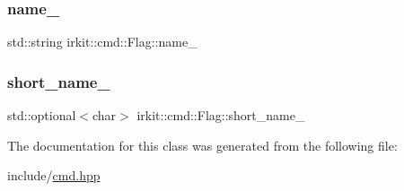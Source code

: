 \subsubsection{\texorpdfstring{name\+\_\+}{name\_}}
{\footnotesize\ttfamily std\+::string irkit\+::cmd\+::\+Flag\+::name\+\_\+\hspace{0.3cm}{\ttfamily [protected]}}

\mbox{\label{classirkit_1_1cmd_1_1Flag_a0bfb19b466585afe43271433459f04e9}} 
\subsubsection{\texorpdfstring{short\+\_\+name\+\_\+}{short\_name\_}}
{\footnotesize\ttfamily std\+::optional$<$char$>$ irkit\+::cmd\+::\+Flag\+::short\+\_\+name\+\_\+\hspace{0.3cm}{\ttfamily [protected]}}



The documentation for this class was generated from the following file\+:\begin{DoxyCompactItemize}
\item 
include/\mbox{\hyperlink{cmd_8hpp}{cmd.\+hpp}}\end{DoxyCompactItemize}
